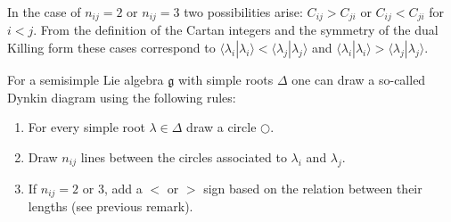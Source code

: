    \begin{remark}
        In the case of $n_{ij} = 2$ or $n_{ij} = 3$ two possibilities arise: $C_{ij}>C_{ji}$ or $C_{ij}<C_{ji}$ for $i<j$. From the definition of the Cartan integers and the symmetry of the dual Killing form these cases correspond to $\langle\lambda_i|\lambda_i\rangle<\langle\lambda_j|\lambda_j\rangle$ and $\langle\lambda_i|\lambda_i\rangle>\langle\lambda_j|\lambda_j\rangle$.
    \end{remark}

    \begin{construct}\label{lie:construct_dynkin}
        For a semisimple Lie algebra $\mathfrak{g}$ with simple roots $\Delta$ one can draw a so-called Dynkin diagram using the following rules:
        \begin{enumerate}
            \item For every simple root $\lambda\in\Delta$ draw a circle $\bigcirc$.
            \item Draw $n_{ij}$ lines between the circles associated to $\lambda_i$ and $\lambda_j$.
            \item If $n_{ij}=2$ or 3, add a $<$ or $>$ sign based on the relation between their lengths (see previous remark).
        \end{enumerate}
    \end{construct}

